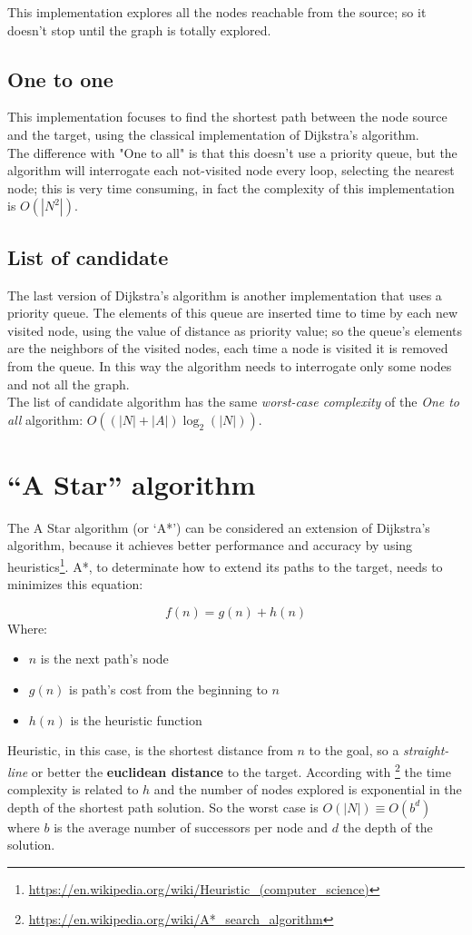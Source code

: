 \documentclass[a4paper,11pt]{report}
\begin{document}
This implementation explores all the nodes reachable from the source; so it doesn't stop until the graph is totally explored.

\subsection{One to one}
This implementation focuses to find the shortest path between the node source and the target, using the classical implementation of Dijkstra's algorithm.\\
The difference with "One to all" is that this doesn't use a priority queue, but the algorithm will interrogate each not-visited node every loop, selecting the nearest node; this is very time consuming, in fact the complexity of this implementation is $O(|N^2|)$.


\subsection{List of candidate}
The last version of Dijkstra's algorithm is another implementation that uses a priority queue. The elements of this queue are inserted time to time by each new visited node, using the value of distance as priority value; so the queue's elements are the neighbors of the visited nodes, each time a node is visited it is removed from the queue. In this way the algorithm needs to interrogate only some nodes and not all the graph.\\
The list of candidate algorithm has the same \textit{worst-case complexity} of the \textit{One to all} algorithm: $O((|N|+|A|)\log_2(|N|))$.

\section{``A Star'' algorithm}
The A Star algorithm (or `A*') can be considered an extension of Dijkstra's algorithm, because it achieves better performance and accuracy by using heuristics\footnote{\url{https://en.wikipedia.org/wiki/Heuristic_(computer_science)}}. A*, to determinate how to extend its paths to the target, needs to minimizes this equation:

$$ f(n) = g(n) + h(n)$$
Where:
\begin{itemize}
	\item $n$ is the next path's node
	\item $g(n)$ is path's cost from the beginning to $n$
	\item $h(n)$ is the heuristic function
\end{itemize}
Heuristic, in this case, is the shortest distance from $n$ to the goal, so a \textit{straight-line} or better the \textbf{euclidean distance} to the target.
According with \footnote{\url{https://en.wikipedia.org/wiki/A*_search_algorithm}} the time complexity is related to $h$ and the number of nodes explored is exponential in the depth of the shortest path solution.
So the worst case is $O(|N|) \equiv O(b^d)$ where $b$ is the average number of successors per node and $d$ the depth of the solution.
\end{document}

